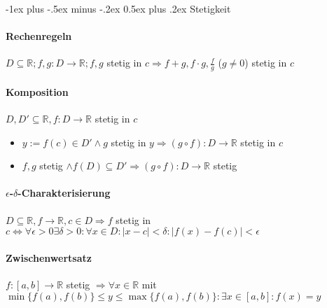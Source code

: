 \documentclass[paper=a4,paper=landscape, fontsize=6pt,DIV=25, twoside]{scrartcl}
\makeatletter
\newcommand{\real}{{\mathbb{R}}}
\renewcommand{\section}{\@startsection{section}{1}{0mm}%
                                {-1ex plus -.5ex minus -.2ex}%
                                {0.5ex plus .2ex}%
                                {\normalfont\large\bfseries}}
\makeatother
\begin{document}
\begin{multicols*}{4}
		\section{Stetigkeit}
			\paragraph{Rechenregeln}
			$D \subseteq \real;f,g: D \rightarrow \real;f,g$ stetig in $c \Rightarrow f+g, f \cdot g,\frac{f}{g}$ ($g \neq 0$) stetig in $c$
			\paragraph{Komposition}
			$D,D' \subseteq \real, f:D \rightarrow \real$ stetig in $c$
			\begin{itemize}[noitemsep,nolistsep]
				\item $y := f(c) \in D' \wedge g $ stetig in $y \Rightarrow (g \circ f): D \rightarrow \real$ stetig in $c$
				\item $f,g$ stetig $\wedge f(D) \subseteq D' \Rightarrow (g \circ f): D \rightarrow \real$ stetig
			\end{itemize}
			\paragraph{$\epsilon$-$\delta$-Charakterisierung}
			$D \subseteq \real, f \rightarrow \real, c \in D \Rightarrow f$ stetig in $c \Leftrightarrow \forall \epsilon > 0 \exists \delta > 0: \forall x \in D: \lvert x - c \rvert < \delta: \lvert f(x)-f(c)\rvert < \epsilon$
			\paragraph{Zwischenwertsatz}
			$f:[a,b] \rightarrow \real$ stetig $\Rightarrow \forall x \in \real$ mit $ \min\{f(a),f(b)\} \leq y \leq \max\{f(a), f(b)\}: \exists x \in [a,b]: f(x)=y$

\end{multicols*}
\end{document}
